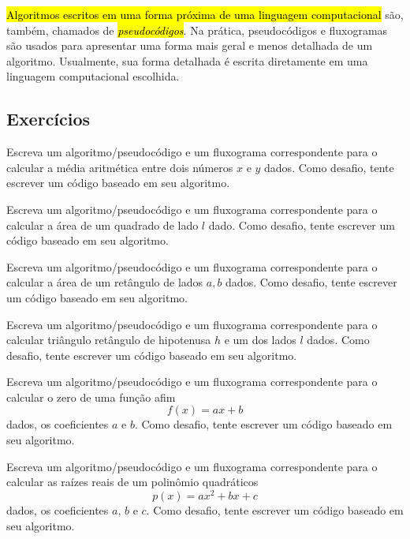 \hl{Algoritmos escritos em uma forma próxima de uma linguagem computacional} são, também, chamados de \hl{\emph{pseudocódigos}}. Na prática, pseudocódigos e fluxogramas são usados para apresentar uma forma mais geral e menos detalhada de um algoritmo. Usualmente, sua forma detalhada é escrita diretamente em uma linguagem computacional escolhida.

\subsection{Exercícios}

\begin{exer}
  Escreva um algoritmo/pseudocódigo e um fluxograma correspondente para o calcular a média aritmética entre dois números $x$ e $y$ dados. Como desafio, tente escrever um código {\python} baseado em seu algoritmo.
\end{exer}

\begin{exer}
  Escreva um algoritmo/pseudocódigo e um fluxograma correspondente para o calcular a área de um quadrado de lado $l$ dado. Como desafio, tente escrever um código {\python} baseado em seu algoritmo.
\end{exer}

\begin{exer}
  Escreva um algoritmo/pseudocódigo e um fluxograma correspondente para o calcular a área de um retângulo de lados $a, b$ dados. Como desafio, tente escrever um código {\python} baseado em seu algoritmo.
\end{exer}

\begin{exer}
  Escreva um algoritmo/pseudocódigo e um fluxograma correspondente para o calcular triângulo retângulo de hipotenusa $h$ e um dos lados $l$ dados. Como desafio, tente escrever um código {\python} baseado em seu algoritmo.
\end{exer}

\begin{exer}
  Escreva um algoritmo/pseudocódigo e um fluxograma correspondente para o calcular o zero de uma função afim
  \begin{equation}
    f(x) = ax + b
  \end{equation}
  dados, os coeficientes $a$ e $b$. Como desafio, tente escrever um código {\python} baseado em seu algoritmo.
\end{exer}

\begin{exer}
  Escreva um algoritmo/pseudocódigo e um fluxograma correspondente para o calcular as raízes reais de um polinômio quadráticos
  \begin{equation}
    p(x) = ax^2 + bx + c
  \end{equation}
  dados, os coeficientes $a$, $b$ e $c$. Como desafio, tente escrever um código {\python} baseado em seu algoritmo.
\end{exer}

